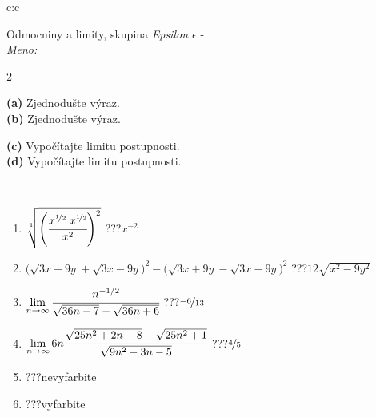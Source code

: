 \documentclass[10pt]{report}
\begin{document}
\begin{tabular}{c:c}
\begin{minipage}[c][104.5mm][t]{0.5\linewidth}
\begin{center}
\vspace{7mm}
{\huge Odmocniny a limity, skupina \textit{Epsilon $\epsilon$} -}\\[5mm]
\textit{Meno:}\phantom{xxxxxxxxxxxxxxxxxxxxxxxxxxxxxxxxxxxxxxxxxxxxxxxxxxxxxxxxxxxxxxxxx}\\[5mm]
\begin{minipage}{0.95\linewidth}
\begin{center}
{\small \begin{multicols}{2} \raggedright
\textbf{(a)} Zjednodušte výraz. \\[1mm]
\textbf{(b)} Zjednodušte výraz. \par \columnbreak
\textbf{(c)} Vypočítajte limitu postupnosti. \\[1mm]
\textbf{(d)} Vypočítajte limitu postupnosti.
\end{multicols}
}
\end{center}
\end{minipage}
\\[4mm]
\begin{minipage}{0.79\linewidth}
\begin{center}
\begin{varwidth}{\linewidth}
\begin{enumerate}
\small
\item $\sqrt[1]{\left(\cfrac{x^{\nicefrac{1}{2}}\;x^{\nicefrac{1}{2}}}{x^{2}}\right)^{2}}$\quad \dotfill\; ???\;\dotfill \quad $x^{-2}$
\item {\footnotesize{\scriptsize$\big(\sqrt{3x+9y}+\sqrt{3x-9y}\big)^2-\big(\sqrt{3x+9y}-\sqrt{3x-9y}\big)^2$}\quad \dotfill\; ???\;\dotfill \quad $12\sqrt{x^2-9y^2}$}
\item $\lim\limits_{n\to\infty}\cfrac{n^{-1/2}}{\sqrt{36n-7}-\sqrt{36n+6}}$\quad \dotfill\; ???\;\dotfill \quad $\nicefrac{-6}{13}$
\item $\lim\limits_{n\to\infty}6n\cfrac{\sqrt{25n^2+2n+8}-\sqrt{25n^2+1}}{\sqrt{9n^2-3n-5}}$\quad \dotfill\; ???\;\dotfill \quad $\nicefrac{4}{5}$
\item \quad \dotfill\; ???\;\dotfill \quad nevyfarbite
\item \quad \dotfill\; ???\;\dotfill \quad vyfarbite
\end{enumerate}
\end{varwidth}
\end{center}

\end{minipage}
\end{center}
\end{minipage}
\end{tabular}
\end{document}
